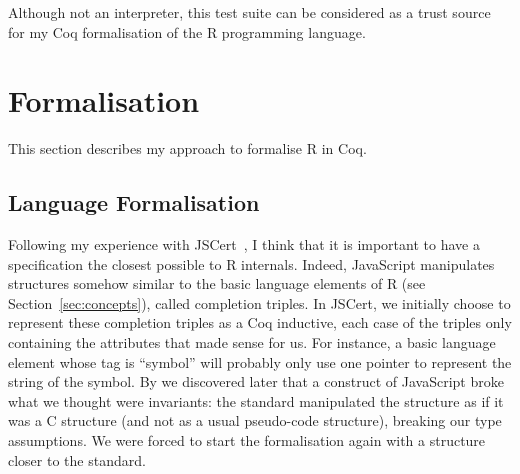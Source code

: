 \documentclass{article}
\newcommand\Coq{Coq}
\newcommand\R{R}
\newcommand\Cn{C}
\begin{document}
Although not an interpreter,
this test suite can be considered as a trust source
for my \Coq{} formalisation of the \R{} programming language.


\section{Formalisation}

This section describes my approach to formalise \R{} in \Coq{}.

\subsection{Language Formalisation}

Following my experience with JSCert~\parencite{bodin2014trusted},
I think that it is important to have a specification
the closest possible to \R{} internals.
Indeed, JavaScript manipulates structures somehow similar
to the basic language elements of \R{} (see Section~\ref{sec:concepts}),
called completion triples.
In JSCert, we initially choose to represent these completion triples
as a \Coq{} inductive,
each case of the triples only containing the attributes that made sense for us.
For instance, a basic language element whose tag is “symbol”
will probably only use one pointer to represent the string of the symbol.
By we discovered later that a construct of JavaScript %
broke what we thought were invariants:
the standard manipulated the structure as if it was a \Cn{} structure
(and not as a usual pseudo-code structure),
breaking our type assumptions.
We were forced to start the formalisation again with a structure
closer to the standard.
\end{document}
